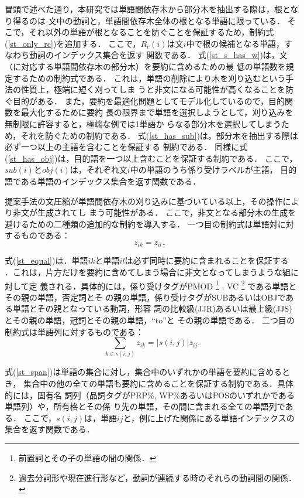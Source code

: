 \documentclass[japanese]{jnlp_1.4}
\begin{document}
冒頭で述べた通り，本研究では単語間依存木から部分木を抽出する際は，根となり得るのは
文中の動詞と，単語間依存木全体の根となる単語に限っている．
そこで，それ以外の単語が根となることを防ぐことを保証するため，制約式
(\ref{st_only_rc})を追加する．
ここで，$R_c(i)$は文$i$中で根の候補となる単語，すなわち動詞のインデックス集合を返す
関数である．
式(\ref{st_s_has_w})は，文（に対応する単語間依存木の部分木）を要約に含めるための最
低の単語数を規定するための制約式である．
これは，単語の削除により木を刈り込むという手法の性質上，極端に短く刈ってしま
うと非文になる可能性が高くなることを防ぐ目的がある．
また，要約を最適化問題としてモデル化しているので，目的関数を最大化するために要約
長の限界まで単語を選択しようとして，刈り込みを無制限に許容すると，極端な例では1単語か
らなる部分木を選択してしまうため，それを防ぐための制約である．
式(\ref{st_has_sub})は，部分木を抽出する際は必ず一つ以上の主語を含むことを保証する
制約である．
同様に式(\ref{st_has_obj})は，目的語を一つ以上含むことを保証する制約である．
ここで，$sub(i)$と$obj(i)$は，それぞれ文$i$中の単語のうち係り受けラベルが主語，
目的語である単語のインデックス集合を返す関数である．

提案手法の文圧縮が単語間依存木の刈り込みに基づいている以上，その操作により非文が生成されてし
まう可能性がある．
ここで，非文となる部分木の生成を避けるための二種類の追加的な制約を導入する．
一つ目の制約式は単語対に対するものである：
\begin{equation}
  z_{ik} = z_{il}．  \label{st_equal}
\end{equation}

式(\ref{st_equal})は．単語$ik$と単語$il$は必ず同時に要約に含まれることを保証する
．これは，片方だけを要約に含めてしまう場合に非文となってしまうような組に対して定
義される．具体的には，係り受けタグがPMOD
\footnote{前置詞とその子の単語の間の関係．}
, VC
\footnote{過去分詞形や現在進行形など，動詞が連続する時のそれらの動詞間の関係．}
である単語とその親の単語，否定詞とそ
の親の単語，係り受けタグがSUBあるいはOBJである単語とその親となっている動詞，形容
詞の比較級(JJR)あるいは最上級(JJS)とその親の単語，冠詞とその親の単語，``to''と
その親の単語である．
二つ目の制約式は単語列に対するものである：
\begin{equation}
  \sum_{k \in s(i,j)} z_{ik} = |s(i,j)| z_{ij}.  \label{st_span}
\end{equation}

式(\ref{st_span})は単語の集合に対し，集合中のいずれかの単語を要約に含めるとき，
集合中の他の全ての単語も要約に含めることを保証する制約である．具体的には，固有名
詞列（品詞タグがPRP\%, WP\%あるいはPOSのいずれかである単語列）や，所有格とその係
り先の単語，その間に含まれる全ての単語列である．
ここで，$s(i,j)$は，単語$ij$と，例に上げた関係にある単語インデックスの集合を返す関数である．
\vspace{-0.3\Cvs}
\end{document}
